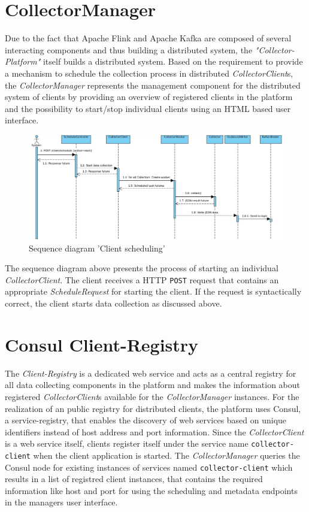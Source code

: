 \section{CollectorManager}
\label{sec:arch-collector-manager}
Due to the fact that Apache Flink and Apache Kafka are composed of several interacting components and thus building
a distributed system, the \textit{"Collector-Platform"} itself builds a distributed system. Based on the requirement to provide a
mechanism to schedule the collection process in distributed \textit{CollectorClient}s, the \textit{CollectorManager} represents the management
component for the distributed system of clients by providing an overview of registered clients in the platform and
the possibility to start/stop individual clients using an HTML based user interface.

\begin{figure}[H]
 	\centering
 	\includegraphics[width=1.0\textwidth]{../uml/sequence-scheduling.jpg}
 	\caption{Sequence diagram 'Client scheduling'}
 	\label{fig:sequence-client-scheduling}
 \end{figure}

The sequence diagram above presents the process of starting an individual \textit{CollectorClient}. The client receives a HTTP
\verb|POST| request that contains an appropriate \textit{ScheduleRequest} for starting the client. If the request is syntactically
correct, the client starts data collection as discussed above.

\section{Consul Client-Registry}

The \textit{Client-Registry} is a dedicated web service and acts as a central registry for all data collecting components
in the platform and makes the information about registered \textit{CollectorClient}s available for the \textit{CollectorManager} instances.
For the realization of an public registry for distributed clients, the platform uses Consul, a service-registry, that enables the discovery
of web services based on unique identifiers instead of host address and port information. Since the \textit{CollectorClient} is a web service itself,
clients register itself under the service name \verb|collector-client| when the client application is started. The \textit{CollectorManager}
queries the Consul node for existing instances of services named \verb|collector-client| which results in a list of registred client instances,
that contains the required information like host and port for using the scheduling and metadata endpoints in the managers user interface.

